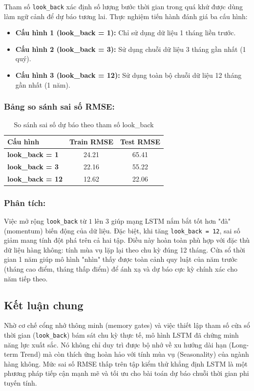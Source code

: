 Tham số \texttt{look\_back} xác định số lượng bước thời gian trong quá khứ được dùng làm ngữ cảnh để dự báo tương lai. Thực nghiệm tiến hành đánh giá ba cấu hình:

\begin{itemize}
    \item \textbf{Cấu hình 1 (look\_back = 1):} Chỉ sử dụng dữ liệu 1 tháng liền trước.
    \item \textbf{Cấu hình 2 (look\_back = 3):} Sử dụng chuỗi dữ liệu 3 tháng gần nhất (1 quý).
    \item \textbf{Cấu hình 3 (look\_back = 12):} Sử dụng toàn bộ chuỗi dữ liệu 12 tháng gần nhất (1 năm).
\end{itemize}

\subsubsection{Bảng so sánh sai số RMSE:}

\begin{table}[H]
    \centering
    \begin{tabular}{|l|c|c|}
        \hline
        \textbf{Cấu hình} & \textbf{Train RMSE} & \textbf{Test RMSE} \\ \hline
        \textbf{look\_back = 1} & 24.21 & 65.41 \\ \hline
        \textbf{look\_back = 3} & 22.16 & 55.22 \\ \hline
        \textbf{look\_back = 12} & 12.62 & 22.06 \\ \hline
    \end{tabular}
    \caption{So sánh sai số dự báo theo tham số look\_back}
\end{table}

\subsubsection{Phân tích:} 
Việc mở rộng \texttt{look\_back} từ $1$ lên $3$ giúp mạng LSTM nắm bắt tốt hơn "đà" (momentum) biến động của dữ liệu. Đặc biệt, khi tăng \texttt{look\_back = 12}, sai số giảm mang tính đột phá trên cả hai tập. Điều này hoàn toàn phù hợp với đặc thù dữ liệu hàng không: tính mùa vụ lặp lại theo chu kỳ đúng 12 tháng. Cửa sổ thời gian 1 năm giúp mô hình "nhìn" thấy được toàn cảnh quy luật của năm trước (tháng cao điểm, tháng thấp điểm) để ánh xạ và dự báo cực kỳ chính xác cho năm tiếp theo.

\subsection{Kết luận chung}

Nhờ cơ chế cổng nhớ thông minh (memory gates) và việc thiết lập tham số cửa sổ thời gian (\texttt{look\_back}) bám sát chu kỳ thực tế, mô hình LSTM đã chứng minh năng lực xuất sắc. Nó không chỉ duy trì được bộ nhớ về xu hướng dài hạn (Long-term Trend) mà còn thích ứng hoàn hảo với tính mùa vụ (Seasonality) của ngành hàng không. Mức sai số RMSE thấp trên tập kiểm thử khẳng định LSTM là một phương pháp tiếp cận mạnh mẽ và tối ưu cho bài toán dự báo chuỗi thời gian phi tuyến tính.